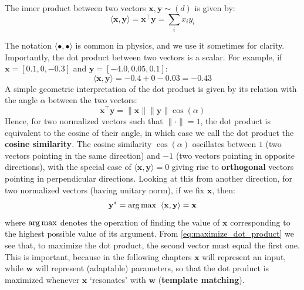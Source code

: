 \begin{definition}   \addbottle
    The inner product between two vectors $\mathbf{x}, \mathbf{y} \sim (d)$ is given by:
    \begin{equation}
            \langle \mathbf{x},\mathbf{y}\rangle=\mathbf{x}^\top\mathbf{y}=\sum_ix_iy_i
    \end{equation}
\end{definition}
%
The notation $\langle \bullet, \bullet \rangle$ is common in physics, and we use it sometimes for clarity. Importantly, the dot product between two vectors is a scalar. For example, if $\mathbf{x} = [0.1, 0, -0.3]$ and $\mathbf{y}=[-4.0, 0.05, 0.1]$:
%
\begin{equation*}
    \langle \mathbf{x}, \mathbf{y} \rangle = - 0.4 + 0 - 0.03 = - 0.43
\end{equation*}
%
A simple geometric interpretation of the dot product is given by its relation with the angle $\alpha$ between the two vectors:
%
\begin{equation}
    \mathbf{x}^\top\mathbf{y}=\lVert\mathbf{x}\rVert \lVert\mathbf{y}\rVert\cos(\alpha)
     \label{eq:dot_product_cosine}
\end{equation}
%
Hence, for two normalized vectors such that $\lVert \cdot \rVert = 1$, the dot product is equivalent to the cosine of their angle, in which case we call the dot product the \textbf{cosine similarity}. The cosine similarity $\cos(\alpha)$ oscillates between $1$ (two vectors pointing in the same direction) and $-1$ (two vectors pointing in opposite directions), with the special case of $\langle \mathbf{x}, \mathbf{y} \rangle=0$ giving rise to \textbf{orthogonal} vectors pointing in perpendicular directions. Looking at this from another direction, for two normalized vectors (having unitary norm), if we fix $\mathbf{x}$, then:
%
\begin{equation}
    \mathbf{y}^* = \operatorname*{arg\,max} \;\; \langle \mathbf{x}, \mathbf{y} \rangle = \mathbf{x}
    \label{eq:maximize_dot_product}
\end{equation}
%
where $\operatorname*{arg\,max}$ denotes the operation of finding the value of $\mathbf{x}$ corresponding to the highest possible value of its argument. From \eqref{eq:maximize_dot_product} we see that, to maximize the dot product, the second vector must equal the first one. This is important, because in the following chapters $\mathbf{x}$ will represent an input, while $\mathbf{w}$ will represent (adaptable) parameters, so that the dot product is maximized whenever $\mathbf{x}$ `resonates' with $\mathbf{w}$ (\textbf{template matching}).

